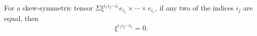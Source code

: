 For a skew-symmetric tensor $\Sigma \xi^{i_1 i_2 \cdots i_r} e_{i_1} \times \cdots \times e_{i_r}$, if any two of the indices $i_j$ are equal, then
$$\xi^{i_1 i_2 \cdots i_r} = 0.$$
